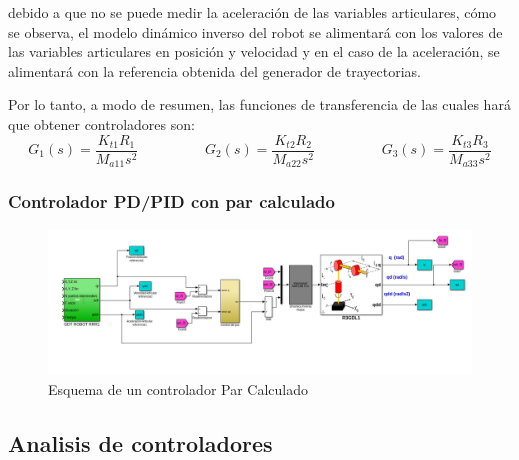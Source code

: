 debido a que no se puede medir la aceleración de las variables articulares, cómo se observa, el modelo dinámico inverso del robot se alimentará con los valores de las variables articulares en posición y velocidad y en el caso de la aceleración, se alimentará con la referencia obtenida del generador de trayectorias.

Por lo tanto, a modo de resumen, las funciones de transferencia de las cuales hará que obtener controladores son:
\begin{equation}
	G_{1}(s)=\frac{K_{t1}R_1}{M_{a11}s^{2}} \hspace{2cm} G_{2}(s)=\frac{K_{t2}R_2}{M_{a22}s^{2}} \hspace{2cm} G_{3}(s)=\frac{K_{t3}R_3}{M_{a33}s^{2}}
\end{equation}


	\subsubsection{Controlador PD/PID con par calculado}

	\begin{figure}[h!]
		\centering
		\includegraphics[width=.8\textwidth]{montaje_parcalcul}
		\caption{Esquema de un controlador Par Calculado}
	\end{figure}

























	\subsection{Analisis de controladores}
